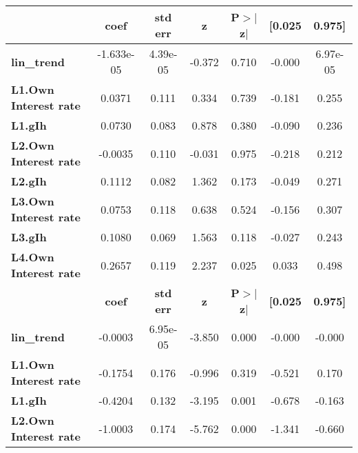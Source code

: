 \begin{center}
\begin{tabular}{lcccccc}
\toprule
                              & \textbf{coef} & \textbf{std err} & \textbf{z} & \textbf{P$> |$z$|$} & \textbf{[0.025} & \textbf{0.975]}  \\
\midrule
\textbf{lin\_trend}           &   -1.633e-05  &     4.39e-05     &    -0.372  &         0.710        &       -0.000    &     6.97e-05     \\
\textbf{L1.Own Interest rate} &       0.0371  &        0.111     &     0.334  &         0.739        &       -0.181    &        0.255     \\
\textbf{L1.gIh}               &       0.0730  &        0.083     &     0.878  &         0.380        &       -0.090    &        0.236     \\
\textbf{L2.Own Interest rate} &      -0.0035  &        0.110     &    -0.031  &         0.975        &       -0.218    &        0.212     \\
\textbf{L2.gIh}               &       0.1112  &        0.082     &     1.362  &         0.173        &       -0.049    &        0.271     \\
\textbf{L3.Own Interest rate} &       0.0753  &        0.118     &     0.638  &         0.524        &       -0.156    &        0.307     \\
\textbf{L3.gIh}               &       0.1080  &        0.069     &     1.563  &         0.118        &       -0.027    &        0.243     \\
\textbf{L4.Own Interest rate} &       0.2657  &        0.119     &     2.237  &         0.025        &        0.033    &        0.498     \\
                              & \textbf{coef} & \textbf{std err} & \textbf{z} & \textbf{P$> |$z$|$} & \textbf{[0.025} & \textbf{0.975]}  \\
\midrule
\textbf{lin\_trend}           &      -0.0003  &     6.95e-05     &    -3.850  &         0.000        &       -0.000    &       -0.000     \\
\textbf{L1.Own Interest rate} &      -0.1754  &        0.176     &    -0.996  &         0.319        &       -0.521    &        0.170     \\
\textbf{L1.gIh}               &      -0.4204  &        0.132     &    -3.195  &         0.001        &       -0.678    &       -0.163     \\
\textbf{L2.Own Interest rate} &      -1.0003  &        0.174     &    -5.762  &         0.000        &       -1.341    &       -0.660     \\

\end{tabular}
\end{center}
